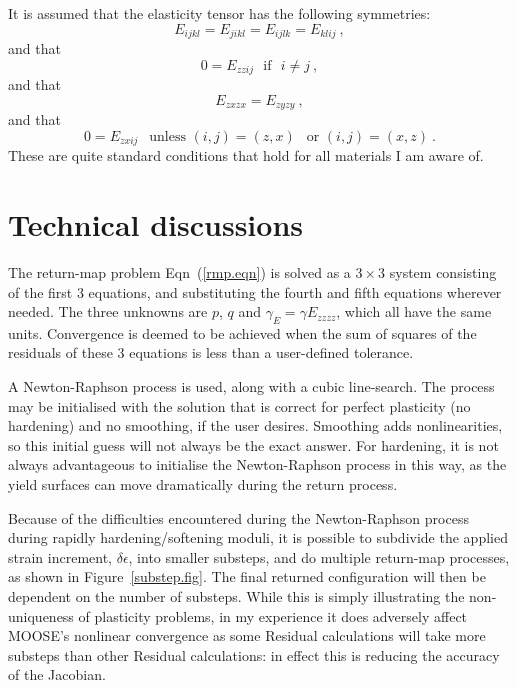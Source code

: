 \documentclass[]{scrreprt}
\newcommand{\ga}{\gamma}
\begin{document}
It is assumed that the elasticity tensor has the following symmetries:
\begin{equation}
E_{ijkl} = E_{jikl} = E_{ijlk} = E_{klij} \ ,
\end{equation}
and that
\begin{equation}
0 = E_{zzij} \ \ \ \mbox{if}\ \ \ i\neq j \ ,
\end{equation}
and that
\begin{equation}
E_{zxzx} = E_{zyzy} \ ,
\end{equation}
and that
\begin{equation}
0 = E_{zxij} \ \ \mbox{ unless } (i, j) = (z, x) \ \ \mbox{ or } (i,
j) = (x, z) \ .
\end{equation}
These are quite standard conditions that hold for all materials I am
aware of.


\chapter{Technical discussions}

The return-map problem Eqn~(\ref{rmp.eqn}) is solved as a $3\times 3$
system consisting of the first 3 equations, and substituting the fourth and
fifth equations wherever needed.  The three unknowns are $p$, $q$ and
$\ga_{E}=\gamma E_{zzzz}$, which all have the same units.  Convergence
is deemed to be achieved when the sum of squares of the residuals of
these 3 equations is less than a user-defined tolerance.

A Newton-Raphson process is used, along with a cubic line-search.  The
process may be initialised with the solution that is correct for
perfect plasticity (no hardening) and no smoothing, if the user
desires.  Smoothing adds nonlinearities, so this initial guess will
not always be the exact answer. For hardening, it is not
always advantageous to initialise the Newton-Raphson process in this
way, as the yield surfaces can move dramatically during the return
process.

Because of the difficulties encountered during the Newton-Raphson
process during rapidly hardening/softening moduli, it is possible to
subdivide the applied strain increment, $\delta\epsilon$, into smaller
substeps, and do multiple return-map processes, as shown in
Figure~\ref{substep.fig}.  The final returned configuration will then
be dependent on the number of substeps.  While this is simply
illustrating the non-uniqueness of plasticity problems, in my
experience it does adversely affect MOOSE's nonlinear convergence as
some Residual calculations will take more substeps than other Residual
calculations: in effect this is reducing the accuracy of the Jacobian.
\end{document}

